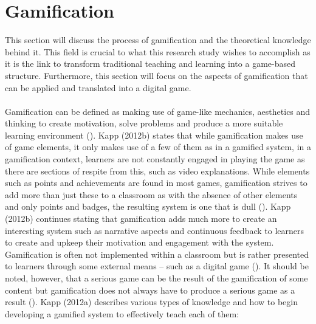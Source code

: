 \section{Gamification}
This section will discuss the process of gamification and the theoretical knowledge behind it. This field is crucial to what this research study wishes to accomplish as it is the link to transform traditional teaching and learning into a game-based structure. Furthermore, this section will focus on the aspects of gamification that can be applied and translated into a digital game. 
\\\\
Gamification can be defined as making use of game-like mechanics, aesthetics and thinking to create motivation, solve problems and produce a more suitable learning environment (\cite{Kapp2012a}). Kapp (2012b) states that while gamification makes use of game elements, it only makes use of a few of them as in a gamified system, in a gamification context, learners are not constantly engaged in playing the game as there are sections of respite from this, such as video explanations. While elements such as points and achievements are found in most games, gamification strives to add more than just these to a classroom as with the absence of other elements and only points and badges, the resulting system is one that is dull (\cite{KappArticle2012}). Kapp (2012b) continues stating that gamification adds much more to create an interesting system such as narrative aspects and continuous feedback to learners to create and upkeep their motivation and engagement with the system.
\newpage
Gamification is often not implemented within a classroom but is rather presented to learners through some external means – such as a digital game (\cite{KappArticle2012}). It should be noted, however, that a serious game can be the result of the gamification of some content but gamification does not always have to produce a serious game as a result (\cite{KappArticle2012}).  Kapp (2012a) describes various types of knowledge and how to begin developing a gamified system to effectively teach each of them:

